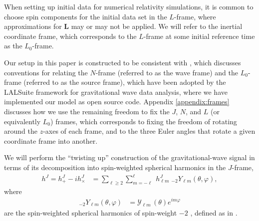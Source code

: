 \documentclass[%
aps,
prd,
amssymb,
amsmath,
amsfonts,
eqsecnum,
showpacs,
nofootinbib,
floatfix,
twocolumn,
twoside,
a4paper,
superscriptaddress
]{revtex4-1}
\begin{document}
When setting up initial data for numerical relativity simulations, it is common to 
choose spin components for the initial data set in the $L$-frame, where approximations for $\mathbf{L}$ may or may not be applied.
We will refer to the inertial coordinate frame, which corresponds to the $L$-frame at some initial reference time as the $L_0$-frame.

Our setup in this paper is constructed to be consistent with \cite{Schmidt:2017btt}, which discusses conventions for relating the 
$N$-frame (referred to as the wave frame) and the $L_0$-frame (referred to as the source frame), which have been adopted by the LALSuite \cite{lalsuite} framework for gravitational wave data analysis, where we have implemented our model as open source code.
%
Appendix \ref{appendix:frames} discusses how we use the remaining freedom
to fix the $J$, $N$, and $L$ (or equivalently $L_0$) frames, which corresponds to fixing the freedom of rotating around the $z$-axes of each frame, and to the three Euler angles that rotate a given coordinate frame into another.
%

We will perform the ``twisting up'' construction of the gravitational-wave signal in terms of its decomposition into spin-weighted spherical harmonics in the $J$-frame, \cite{Thorne:1980ru}
\begin{align}\label{eq:def_polarizations_TD}
    h^J = h_{+}^J - i h_{\times}^J &= \displaystyle\sum_{\ell \geq 2} \displaystyle\sum_{m = -\ell}^{\ell} \; h_{\ell m}^J \; _{-2}Y_{\ell m}(\theta,\varphi) ,
\end{align}
where
\begin{align}
    _{-2}Y_{\ell m} (\theta, \varphi) &= \mathcal{Y}_{\ell m} \, (\theta) e^{i m \varphi}
\end{align}
 are the spin-weighted spherical harmonics of spin-weight $-2$ \cite{Goldberg:1966uu}, defined as in \cite{Wiaux:2005fm}.
\end{document}
